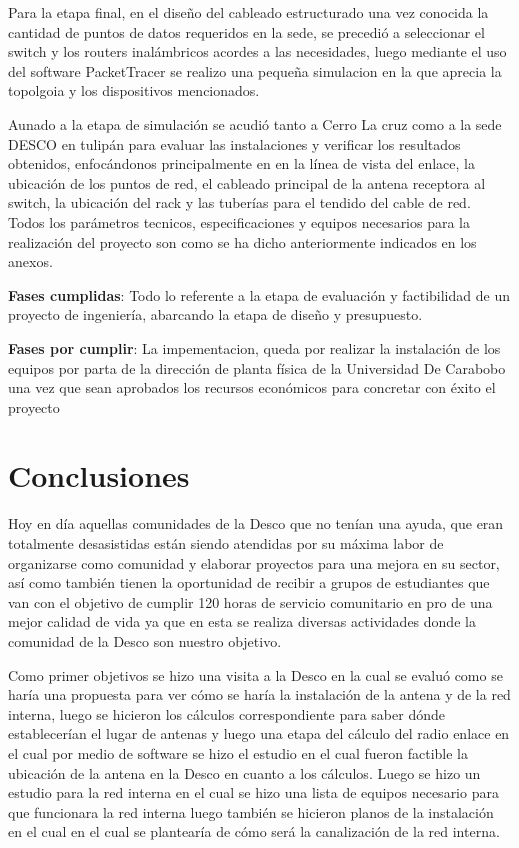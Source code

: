 \documentclass[11pt, a4paper, twosides]{report}
\begin{document}
Para la etapa final, en el diseño del cableado estructurado una vez conocida la cantidad de puntos de datos requeridos en la sede, se precedió a seleccionar el switch y los routers inalámbricos acordes a las necesidades, luego mediante el uso del software PacketTracer se realizo una pequeña simulacion en la que aprecia la topolgoia y los dispositivos mencionados.

Aunado a la etapa de simulación  se acudió tanto a Cerro La cruz como a la sede DESCO en tulipán para evaluar las instalaciones y verificar los resultados obtenidos, enfocándonos principalmente en en la línea de vista del enlace, la ubicación de los puntos de red, el cableado principal de la antena receptora al switch, la ubicación del rack y las tuberías para el tendido del cable de red.
Todos los parámetros tecnicos, especificaciones y equipos necesarios para la realización del proyecto son como se ha dicho anteriormente indicados en los anexos.

\textbf{Fases cumplidas}: Todo lo referente a la etapa de evaluación y factibilidad de un proyecto de ingeniería, abarcando la etapa de diseño y presupuesto.

\textbf{Fases por cumplir}: La impementacion, queda por realizar la instalación de los equipos por parta de la dirección de planta física de la Universidad De Carabobo una vez que sean aprobados los recursos económicos para concretar con éxito el proyecto


\chapter{Conclusiones} 
Hoy en día aquellas comunidades de la Desco que no tenían una ayuda, que eran totalmente desasistidas están siendo atendidas por su máxima labor de organizarse como comunidad y elaborar proyectos para una mejora en su sector, así como también tienen la oportunidad de recibir a grupos de estudiantes que van con el objetivo de cumplir 120 horas de servicio comunitario en pro de una mejor calidad de vida ya que en esta se realiza diversas actividades donde la comunidad de la Desco son nuestro objetivo.

Como primer objetivos se hizo una visita a la Desco en la cual se evaluó como se haría una propuesta para ver cómo se haría la instalación de la antena y de la red interna, luego se hicieron los cálculos correspondiente para saber dónde establecerían el lugar de antenas y luego una etapa del cálculo del radio enlace en el cual por medio de software se hizo el estudio en el cual fueron factible la ubicación de la antena en la Desco en cuanto a los cálculos. Luego se hizo un estudio para la red interna en el cual se hizo una lista de equipos necesario para que funcionara la red interna luego también se hicieron planos de la instalación en el cual en el cual se plantearía de cómo será la canalización de la red interna.
\end{document}
